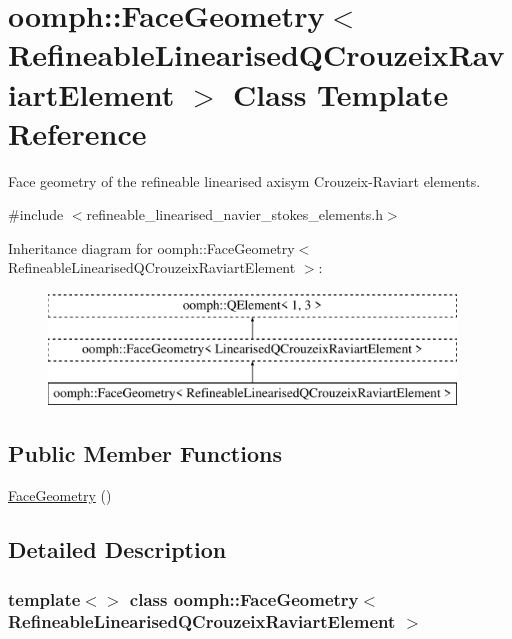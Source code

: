 \hypertarget{classoomph_1_1FaceGeometry_3_01RefineableLinearisedQCrouzeixRaviartElement_01_4}{}\section{oomph\+:\+:Face\+Geometry$<$ Refineable\+Linearised\+Q\+Crouzeix\+Raviart\+Element $>$ Class Template Reference}
\label{classoomph_1_1FaceGeometry_3_01RefineableLinearisedQCrouzeixRaviartElement_01_4}


Face geometry of the refineable linearised axisym Crouzeix-\/\+Raviart elements.  




{\ttfamily \#include $<$refineable\+\_\+linearised\+\_\+navier\+\_\+stokes\+\_\+elements.\+h$>$}

Inheritance diagram for oomph\+:\+:Face\+Geometry$<$ Refineable\+Linearised\+Q\+Crouzeix\+Raviart\+Element $>$\+:\begin{figure}[H]
\begin{center}
\leavevmode
\includegraphics[height=3.000000cm]{classoomph_1_1FaceGeometry_3_01RefineableLinearisedQCrouzeixRaviartElement_01_4}
\end{center}
\end{figure}
\subsection*{Public Member Functions}
\begin{DoxyCompactItemize}
\item 
\hyperlink{classoomph_1_1FaceGeometry_3_01RefineableLinearisedQCrouzeixRaviartElement_01_4_a49c181d8fca317f614ee67c2e6ebe593}{Face\+Geometry} ()
\end{DoxyCompactItemize}


\subsection{Detailed Description}
\subsubsection*{template$<$$>$\newline
class oomph\+::\+Face\+Geometry$<$ Refineable\+Linearised\+Q\+Crouzeix\+Raviart\+Element $>$}

